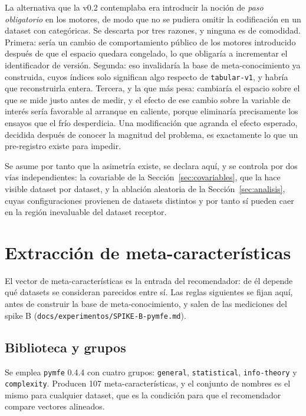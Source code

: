 \documentclass[11pt,letterpaper]{article}
\begin{document}
La alternativa que la v0.2 contemplaba era introducir la noción de \emph{paso
obligatorio} en los motores, de modo que no se pudiera omitir la codificación en
un dataset con categóricas. Se descarta por tres razones, y ninguna es de
comodidad. Primera: sería un cambio de comportamiento público de los motores
introducido después de que el espacio quedara congelado, lo que obligaría a
incrementar el identificador de versión. Segunda: eso invalidaría la base de
meta-conocimiento ya construida, cuyos índices solo significan algo respecto de
\texttt{tabular-v1}, y habría que reconstruirla entera. Tercera, y la que más
pesa: cambiaría el espacio sobre el que se mide justo antes de medir, y el efecto
de ese cambio sobre la variable de interés sería favorable al arranque en
caliente, porque eliminaría precisamente los ensayos que el frío desperdicia. Una
modificación que agranda el efecto esperado, decidida después de conocer la
magnitud del problema, es exactamente lo que un pre-registro existe para impedir.

Se asume por tanto que la asimetría existe, se declara aquí, y se controla por
dos vías independientes: la covariable de la Sección~\ref{sec:covariables}, que la
hace visible dataset por dataset, y la ablación aleatoria de la
Sección~\ref{sec:analisis}, cuyas configuraciones provienen de datasets distintos
y por tanto sí pueden caer en la región inevaluable del dataset receptor.

\section{Extracción de meta-características}
\label{sec:metacar}

El vector de meta-características es la entrada del recomendador: de él depende
qué datasets se consideran parecidos entre sí. Las reglas siguientes se fijan
aquí, antes de construir la base de meta-conocimiento, y salen de las mediciones
del spike B (\texttt{docs/experimentos/SPIKE-B-pymfe.md}).

\subsection{Biblioteca y grupos}

Se emplea \texttt{pymfe} 0.4.4 con cuatro grupos: \texttt{general},
\texttt{statistical}, \texttt{info-theory} y \texttt{complexity}. Producen 107
meta-características, y el conjunto de nombres es el mismo para cualquier
dataset, que es la condición para que el recomendador compare vectores alineados.
\end{document}
